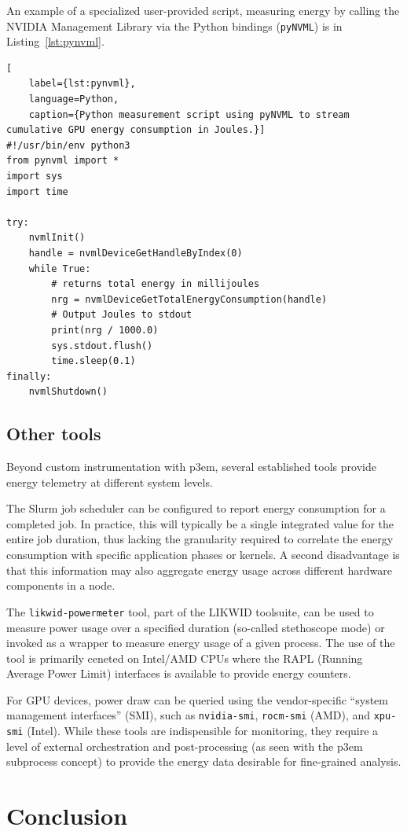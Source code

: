 \documentclass[a4paper,12pt]{article}
\begin{document}
An example of a specialized user-provided script, measuring energy by calling the NVIDIA Management Library
via the Python bindings (\texttt{pyNVML}) is in Listing~\ref{lst:pynvml}.

\begin{lstlisting}[
    label={lst:pynvml},
    language=Python,
    caption={Python measurement script using pyNVML to stream cumulative GPU energy consumption in Joules.}]
#!/usr/bin/env python3
from pynvml import *
import sys
import time

try:
    nvmlInit()
    handle = nvmlDeviceGetHandleByIndex(0)
    while True:
        # returns total energy in millijoules
        nrg = nvmlDeviceGetTotalEnergyConsumption(handle)
        # Output Joules to stdout
        print(nrg / 1000.0)
        sys.stdout.flush()
        time.sleep(0.1)
finally:
    nvmlShutdown()
\end{lstlisting}

\subsection{{Other tools}}

Beyond custom instrumentation with p3em, several established tools provide
energy telemetry at different system levels.

The Slurm job scheduler can be configured to report energy consumption for
a completed job. In practice, this will typically be a single integrated value
for the entire job duration, thus lacking the granularity required to
correlate the energy consumption with specific application phases or kernels.
A second disadvantage is that this information may also aggregate energy usage
across different hardware components in a node.

The \texttt{likwid-powermeter} tool, part of the LIKWID toolsuite,
 can be used to measure power usage
over a specified duration (so-called stethoscope mode) or invoked as a wrapper
to measure energy usage of a given process.
The use of the tool is primarily ceneted on Intel/AMD CPUs where the RAPL (Running Average Power Limit)
interfaces is available to provide energy counters.

For GPU devices, power draw can be queried using the vendor-specific
``system management interfaces'' (SMI),
such as \texttt{nvidia-smi}, \texttt{rocm-smi} (AMD), and \texttt{xpu-smi} (Intel).
While these tools are indispensible for monitoring, they require a level
of external orchestration and post-processing (as seen with the p3em subprocess concept)
to provide the energy data desirable for fine-grained analysis.

\newpage
\section{{Conclusion}} \label{sec:conclusion}






\label{MyLastPage}
\end{document}
